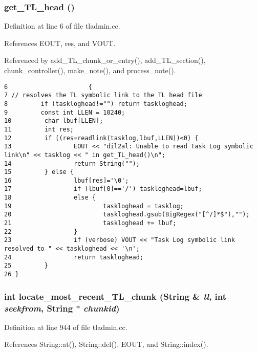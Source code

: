 \subsubsection{ get\_\-TL\_\-head ()}\label{tladmin_8cc_a0}




Definition at line 6 of file tladmin.cc.

References EOUT, res, and VOUT.

Referenced by add\_\-TL\_\-chunk\_\-or\_\-entry(), add\_\-TL\_\-section(), chunk\_\-controller(), make\_\-note(), and process\_\-note().



\footnotesize\begin{verbatim}6                      {
7 // resolves the TL symbolic link to the TL head file
8         if (taskloghead!="") return taskloghead;
9         const int LLEN = 10240;
10         char lbuf[LLEN];
11         int res;
12         if ((res=readlink(tasklog,lbuf,LLEN))<0) {
13                 EOUT << "dil2al: Unable to read Task Log symbolic link\n" << tasklog << " in get_TL_head()\n";
14                 return String("");
15         } else {
16                 lbuf[res]='\0';
17                 if (lbuf[0]=='/') taskloghead=lbuf;
18                 else {
19                         taskloghead = tasklog;
20                         taskloghead.gsub(BigRegex("[^/]*$"),"");
21                         taskloghead += lbuf;
22                 }
23                 if (verbose) VOUT << "Task Log symbolic link resolved to " << taskloghead << '\n';
24                 return taskloghead;
25         }
26 }
\end{verbatim}\normalsize 
{}
\subsubsection{\setlength{\rightskip}{0pt plus 5cm}int locate\_\-most\_\-recent\_\-TL\_\-chunk ({\bf String} \& {\em tl}, int {\em seekfrom}, {\bf String} $\ast$ {\em chunkid})}\label{tladmin_8cc_a11}




Definition at line 944 of file tladmin.cc.

References String::at(), String::del(), EOUT, and String::index().

